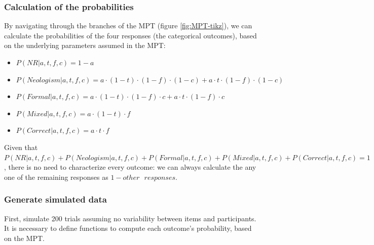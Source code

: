 \documentclass[12pt,]{krantz}
\providecommand{\tightlist}{%
  \setlength{\itemsep}{0pt}\setlength{\parskip}{0pt}}
\theoremstyle{definition}
\theoremstyle{definition}
\theoremstyle{definition}
\theoremstyle{remark}
\begin{document}
\hypertarget{calculation-of-the-probabilities}{%
\subsubsection{Calculation of the probabilities}\label{calculation-of-the-probabilities}}

By navigating through the branches of the MPT (figure \ref{fig:MPT-tikz}), we can calculate the probabilities of the four responses (the categorical outcomes), based on the underlying parameters assumed in the MPT:

\begin{itemize}
\tightlist
\item
  \(P(NR| a,t,f,c)= 1-a\)
\item
  \(P(Neologism| a,t,f,c)= a \cdot (1-t) \cdot (1-f) \cdot (1-c) + a \cdot t \cdot (1-f) \cdot (1-c)\)
\item
  \(P(Formal| a,t,f,c)= a \cdot (1-t) \cdot (1-f) \cdot c + a \cdot t \cdot (1-f) \cdot c\)
\item
  \(P(Mixed| a,t,f,c)= a \cdot (1-t) \cdot f\)
\item
  \(P(Correct| a,t,f,c)= a \cdot t \cdot f\)
\end{itemize}

Given that \(P(NR| a,t,f,c) + P(Neologism| a,t,f,c) + P(Formal| a,t,f,c) + P(Mixed| a,t,f,c) + P(Correct| a,t,f,c) = 1\), there is no need to characterize every outcome: we can always calculate the any one of the remaining responses as \(1 - other\text{ }responses\).

\hypertarget{generate-simulated-data}{%
\subsubsection{Generate simulated data}\label{generate-simulated-data}}

First, simulate 200 trials assuming no variability between items and participants. It is necessary to define functions to compute each outcome's probability, based on the MPT.

\newpage
\end{document}
